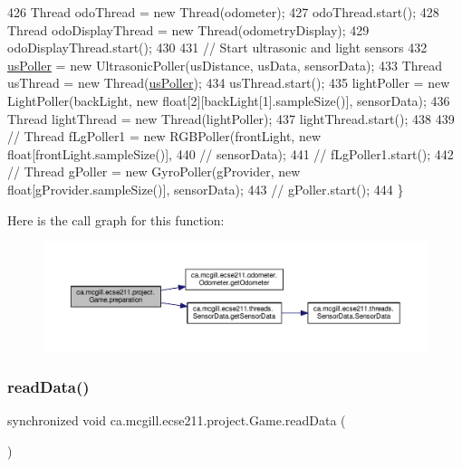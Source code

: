\begin{DoxyCode}
426     Thread odoThread = new Thread(odometer);
427     odoThread.start();
428     Thread odoDisplayThread = new Thread(odometryDisplay);
429     odoDisplayThread.start();
430 
431     \textcolor{comment}{// Start ultrasonic and light sensors}
432     \hyperlink{enumca_1_1mcgill_1_1ecse211_1_1project_1_1_game_af6fee74efff891793b32352caa110465}{usPoller} = new UltrasonicPoller(usDistance, usData, sensorData);
433     Thread usThread = new Thread(\hyperlink{enumca_1_1mcgill_1_1ecse211_1_1project_1_1_game_af6fee74efff891793b32352caa110465}{usPoller});
434     usThread.start();
435     lightPoller = new LightPoller(backLight, new \textcolor{keywordtype}{float}[2][backLight[1].sampleSize()], sensorData);
436     Thread lightThread = new Thread(lightPoller);
437     lightThread.start();
438 
439     \textcolor{comment}{// Thread fLgPoller1 = new RGBPoller(frontLight, new float[frontLight.sampleSize()],}
440     \textcolor{comment}{// sensorData);}
441     \textcolor{comment}{// fLgPoller1.start();}
442     \textcolor{comment}{// Thread gPoller = new GyroPoller(gProvider, new float[gProvider.sampleSize()], sensorData);}
443     \textcolor{comment}{// gPoller.start();}
444   \}
\end{DoxyCode}
Here is the call graph for this function\+:
\nopagebreak
\begin{figure}[H]
\begin{center}
\leavevmode
\includegraphics[width=350pt]{enumca_1_1mcgill_1_1ecse211_1_1project_1_1_game_a8f3c5b18f98ee56f5f03afd72fa40bcb_cgraph}
\end{center}
\end{figure}
\mbox{\label{enumca_1_1mcgill_1_1ecse211_1_1project_1_1_game_ab28110fca0af679acdaea84025746f15}} 
\subsubsection{\texorpdfstring{read\+Data()}{readData()}}
{\footnotesize\ttfamily synchronized void ca.\+mcgill.\+ecse211.\+project.\+Game.\+read\+Data (\begin{DoxyParamCaption}{ }\end{DoxyParamCaption})}

